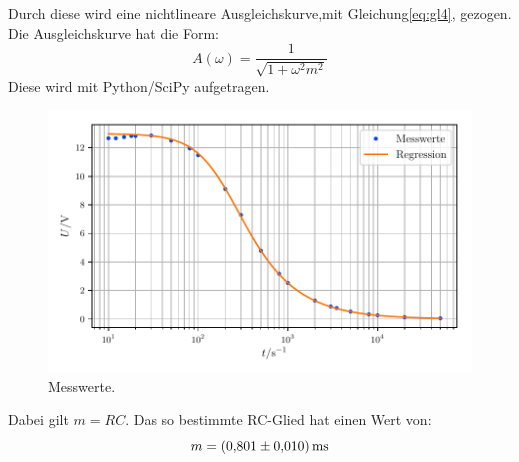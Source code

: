 Durch diese wird eine nichtlineare Ausgleichskurve,mit Gleichung\eqref{eq:gl4}, gezogen.
Die Ausgleichskurve hat die Form:
\begin{equation}
  A(\omega)= \frac{1}{\sqrt{1+\omega^2 m^2}}
\end{equation}
Diese wird mit Python/SciPy aufgetragen.
\begin{figure}[H]
    \centering
    \includegraphics[width=\textwidth]{build/messung2.pdf}
    \caption{Messwerte.}
    \label{fig:plot2}
\end{figure}
\noindent Dabei gilt $m=RC$.
Das so bestimmte RC-Glied hat einen Wert von:
\begin{equation*}
  m = \SI{0.801\pm0.01}{\milli\second}
\end{equation*}
%
